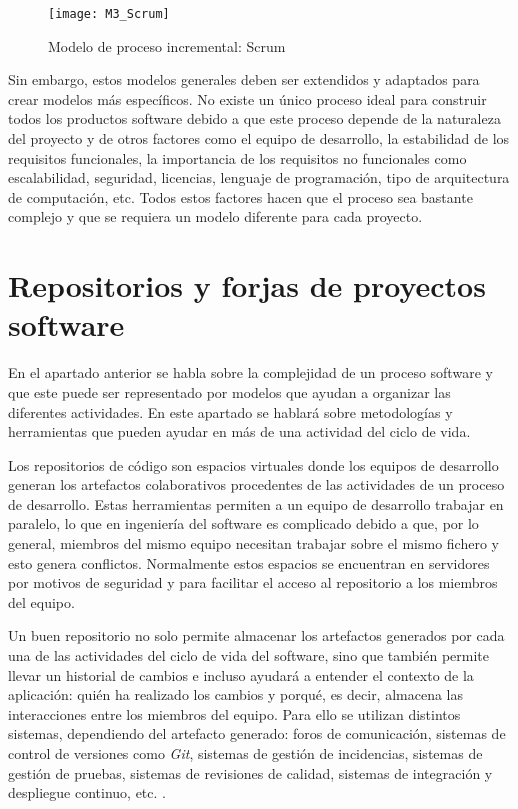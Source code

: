 \begin{figure}[!h]
	\centering
	\texttt{[image: M3\_Scrum]}
	\caption{Modelo de proceso incremental: Scrum \citep{scrum_master_scrum_2019}}
	\label{fig:M3_Scrum}
\end{figure}
\FloatBarrier

Sin embargo, estos modelos generales deben ser extendidos y adaptados para crear modelos más específicos. No existe un único proceso ideal para construir todos los productos software debido a que este proceso depende de la naturaleza del proyecto y de otros factores como el equipo de desarrollo, la estabilidad de los requisitos funcionales, la importancia de los requisitos no funcionales como escalabilidad, seguridad, licencias, lenguaje de programación, tipo de arquitectura de computación, etc. Todos estos factores hacen que el proceso sea bastante complejo y que se requiera un modelo diferente para cada proyecto.

\section{Repositorios y forjas de proyectos software}


En el apartado anterior se habla sobre la complejidad de un proceso software y que este puede ser representado por modelos que ayudan a organizar las diferentes actividades. En este apartado se hablará sobre metodologías y herramientas que pueden ayudar en más de una actividad del ciclo de vida.

Los repositorios de código son espacios virtuales donde los equipos de desarrollo generan los artefactos colaborativos procedentes de las actividades de un proceso de desarrollo. Estas herramientas permiten a un equipo de desarrollo trabajar en paralelo, lo que en ingeniería del software es complicado debido a que, por lo general, miembros del mismo equipo necesitan trabajar sobre el mismo fichero y esto genera conflictos. Normalmente estos espacios se encuentran en servidores por motivos de seguridad y para facilitar el acceso al repositorio a los miembros del equipo.

Un buen repositorio no solo permite almacenar los artefactos generados por cada una de las actividades del ciclo de vida del software, sino que también permite llevar un historial de cambios e incluso ayudará a entender el contexto de la aplicación: quién ha realizado los cambios y porqué, es decir, almacena las interacciones entre los miembros del equipo. Para ello se utilizan distintos sistemas, dependiendo del artefacto generado: foros de comunicación, sistemas de control de versiones como \textit{Git}, sistemas de gestión de incidencias, sistemas de gestión de pruebas, sistemas de revisiones de calidad, sistemas de integración y despliegue continuo, etc. \citep{guemes-pena_emerging_2018}.

